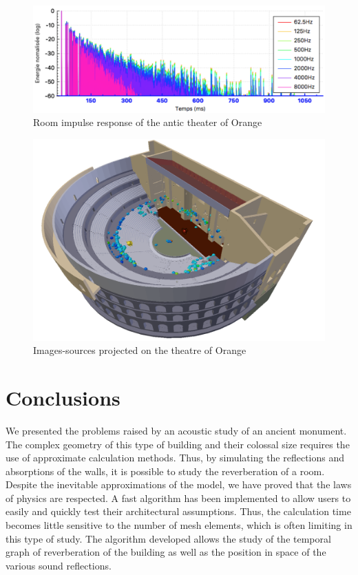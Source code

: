 \documentclass[AMA,STIX1COL]{WileyNJD-v2}
\begin{document}
\begin{figure}
\centering
	\includegraphics[width=0.7\linewidth]{rir}
	\caption{Room impulse response of the antic theater of Orange}
\end{figure}

\begin{figure}
\centering
	\includegraphics[width=0.7\linewidth]{theatre}
	\caption{Images-sources projected on the theatre of Orange}
\end{figure}


\section{Conclusions}

We presented the problems raised by an acoustic study of an ancient monument. The complex geometry of this type of building and their colossal size requires the use of approximate calculation methods. Thus, by simulating the reflections and absorptions of the walls, it is possible to study the reverberation of a room. Despite the inevitable approximations of the model, we have proved that the laws of physics are respected. A fast algorithm has been implemented to allow users to easily and quickly test their architectural assumptions. Thus, the calculation time becomes little sensitive to the number of mesh elements, which is often limiting in this type of study. The algorithm developed allows the study of the temporal graph of reverberation of the building as well as the position in space of the various sound reflections.
\end{document}
